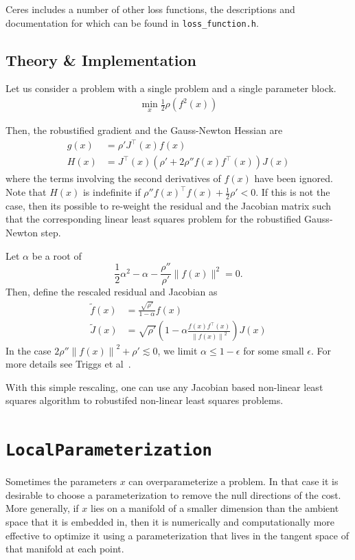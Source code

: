 Ceres includes a number of other loss functions, the descriptions and
documentation for which can be found in \texttt{loss\_function.h}.

\subsection{Theory \& Implementation}
Let us consider a problem with a single problem and a single parameter
block.
\begin{align}
\min_x \frac{1}{2}\rho(f^2(x))
\end{align}

Then, the robustified gradient and the Gauss-Newton Hessian are
\begin{align}
	g(x) &= \rho'J^\top(x)f(x)\\
	H(x) &= J^\top(x)\left(\rho' + 2 \rho''f(x)f^\top(x)\right)J(x) 
\end{align}
where the terms involving the second derivatives of $f(x)$ have been ignored. Note that $H(x)$ is indefinite if $\rho''f(x)^\top f(x) + \frac{1}{2}\rho' < 0$. If this is not the case, then its possible to re-weight the residual and the Jacobian matrix such that the corresponding linear least squares problem for the robustified Gauss-Newton step. 


Let $\alpha$ be a root of 
\begin{equation}
	\frac{1}{2}\alpha^2 - \alpha - \frac{\rho''}{\rho'}\|f(x)\|^2 = 0.
\end{equation}
Then, define the rescaled residual and Jacobian as
\begin{align}
	\tilde{f}(x) &= \frac{\sqrt{\rho'}}{1 - \alpha} f(x)\\
	\tilde{J}(x) &= \sqrt{\rho'}\left(1 - \alpha \frac{f(x)f^\top(x)}{\left\|f(x)\right\|^2} \right)J(x)
\end{align}
In the case $2 \rho''\left\|f(x)\right\|^2 + \rho' \lesssim 0$, we limit $\alpha \le 1- \epsilon$ for some small $\epsilon$. For more details see Triggs et al~\cite{triggs-etal-1999}.

With this simple rescaling, one can use any Jacobian based non-linear least squares algorithm to robustifed non-linear least squares problems.

\section{\texttt{LocalParameterization}}
Sometimes the parameters $x$ can overparameterize a problem. In
that case it is desirable to choose a parameterization to remove
the null directions of the cost. More generally, if $x$ lies on a
manifold of a smaller dimension than the ambient space that it is
embedded in, then it is numerically and computationally more
effective to optimize it using a parameterization that lives in
the tangent space of that manifold at each point.

